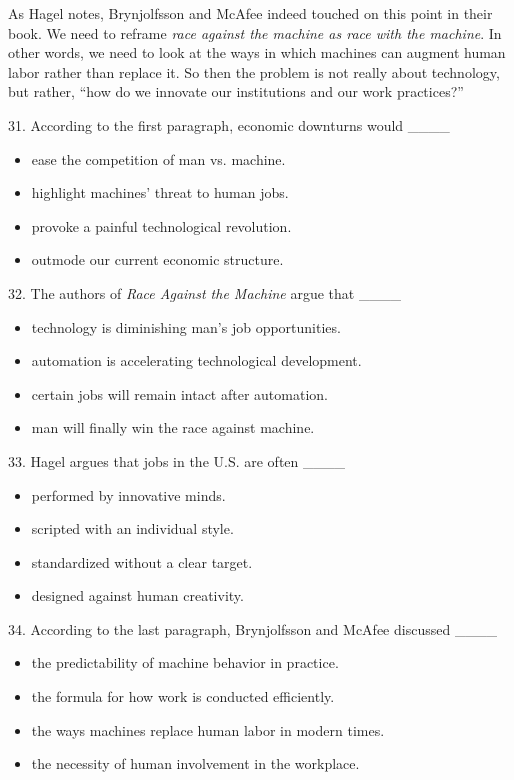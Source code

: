\documentclass[UTF8,11pt]{ctexart}
\begin{document}
As Hagel notes, Brynjolfsson and McAfee indeed touched on this point in their book. We need to reframe \textit{race against the machine as race with the machine}. In other words, we need to look at the ways in which machines can augment human labor rather than replace it. So then the problem is not really about technology, but rather, “how do we innovate our institutions and our work practices?”


31. According to the first paragraph, economic downturns would \_\_\_\_


\begin{itemize}[leftmargin=2em,itemsep=.2em,topsep=.4em]\item[A.] ease the competition of man vs. machine.
\item[B.] highlight machines’ threat to human jobs.
\item[C.] provoke a painful technological revolution.
\item[D.] outmode our current economic structure.
\end{itemize}

32. The authors of \textit{Race Against the Machine} argue that \_\_\_\_


\begin{itemize}[leftmargin=2em,itemsep=.2em,topsep=.4em]\item[A.] technology is diminishing man’s job opportunities.
\item[B.] automation is accelerating technological development.
\item[C.] certain jobs will remain intact after automation.
\item[D.] man will finally win the race against machine.
\end{itemize}

33. Hagel argues that jobs in the U.S. are often \_\_\_\_


\begin{itemize}[leftmargin=2em,itemsep=.2em,topsep=.4em]\item[A.] performed by innovative minds.
\item[B.] scripted with an individual style.
\item[C.] standardized without a clear target.
\item[D.] designed against human creativity.
\end{itemize}

34. According to the last paragraph, Brynjolfsson and McAfee discussed \_\_\_\_


\begin{itemize}[leftmargin=2em,itemsep=.2em,topsep=.4em]\item[A.] the predictability of machine behavior in practice.
\item[B.] the formula for how work is conducted efficiently.
\item[C.] the ways machines replace human labor in modern times.
\item[D.] the necessity of human involvement in the workplace.
\end{itemize}
\end{document}
